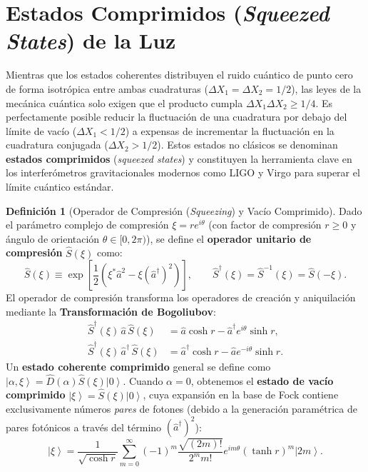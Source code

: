 \documentclass[11pt,a4paper,twoside]{report}
\theoremstyle{definition}
\newtheorem{definicion}{Definición}[chapter]
\theoremstyle{plain}
\theoremstyle{remark}
\newcommand{\ket}[1]{\left| #1 \right\rangle}
\newcommand{\op}[1]{\hat{#1}}
\begin{document}
\section{Estados Comprimidos (\textit{Squeezed States}) de la Luz}

Mientras que los estados coherentes distribuyen el ruido cuántico de punto cero de forma isotrópica entre ambas cuadraturas ($\Delta X_1 = \Delta X_2 = 1/2$), las leyes de la mecánica cuántica solo exigen que el producto cumpla $\Delta X_1 \Delta X_2 \ge 1/4$. Es perfectamente posible reducir la fluctuación de una cuadratura por debajo del límite de vacío ($\Delta X_1 < 1/2$) a expensas de incrementar la fluctuación en la cuadratura conjugada ($\Delta X_2 > 1/2$). Estos estados no clásicos se denominan \textbf{estados comprimidos} (\textit{squeezed states}) y constituyen la herramienta clave en los interferómetros gravitacionales modernos como LIGO y Virgo para superar el límite cuántico estándar.

\begin{definicion}[Operador de Compresión (\textit{Squeezing}) y Vacío Comprimido]
Dado el parámetro complejo de compresión $\xi = r e^{i\theta}$ (con factor de compresión $r \ge 0$ y ángulo de orientación $\theta \in [0, 2\pi)$), se define el \textbf{operador unitario de compresión} $\op{S}(\xi)$ como:
\begin{equation}
    \op{S}(\xi) \equiv \exp\left[ \frac{1}{2}\left( \xi^* \op{a}^2 - \xi (\op{a}^\dagger)^2 \right) \right], \qquad \op{S}^\dagger(\xi) = \op{S}^{-1}(\xi) = \op{S}(-\xi).
\end{equation}
El operador de compresión transforma los operadores de creación y aniquilación mediante la \textbf{Transformación de Bogoliubov}:
\begin{align}
    \op{S}^\dagger(\xi)\, \op{a}\, \op{S}(\xi) &= \op{a}\cosh r - \op{a}^\dagger e^{i\theta}\sinh r, \\
    \op{S}^\dagger(\xi)\, \op{a}^\dagger\, \op{S}(\xi) &= \op{a}^\dagger\cosh r - \op{a} e^{-i\theta}\sinh r.
\end{align}
Un \textbf{estado coherente comprimido} general se define como $\ket{\alpha, \xi} = \op{D}(\alpha)\op{S}(\xi)\ket{0}$. Cuando $\alpha = 0$, obtenemos el \textbf{estado de vacío comprimido} $\ket{\xi} = \op{S}(\xi)\ket{0}$, cuya expansión en la base de Fock contiene exclusivamente números \emph{pares} de fotones (debido a la generación paramétrica de pares fotónicos a través del término $(\op{a}^\dagger)^2$):
\begin{equation}
    \ket{\xi} = \frac{1}{\sqrt{\cosh r}}\sum_{m=0}^{\infty} (-1)^m \frac{\sqrt{(2m)!}}{2^m m!} e^{im\theta} (\tanh r)^m \ket{2m}.
\end{equation}
\end{definicion}
\end{document}
